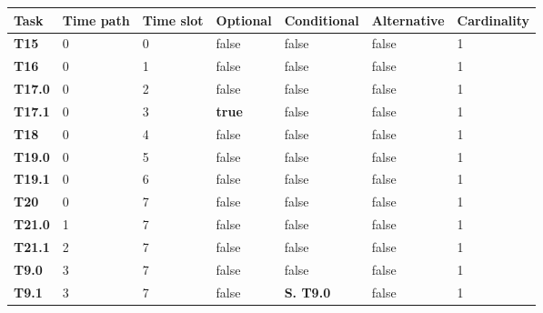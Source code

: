 \begin{table}[ht!]
{\renewcommand{\arraystretch}{1.5}
\begin{tabularx}{\textwidth}{@{}lllllll@{}}
\toprule
\textbf{Task}  & \textbf{Time path} & \textbf{Time slot} & \textbf{Optional} & \textbf{Conditional} & \textbf{Alternative} & \textbf{Cardinality} \\ \midrule
\textbf{T15}   & 0                  & 0                  & false             & false                & false                & 1           \\
\textbf{T16}   & 0                  & 1                  & false             & false                & false                & 1           \\
\textbf{T17.0} & 0                  & 2                  & false             & false                & false                & 1           \\
\textbf{T17.1} & 0                  & 3                  & \textbf{true}    & false                 & false                & 1           \\
\textbf{T18}   & 0                  & 4                  & false             & false                & false                & 1           \\
\textbf{T19.0} & 0                  & 5                  & false             & false                & false                & 1           \\
\textbf{T19.1} & 0                  & 6                  & false             & false                & false                & 1           \\
\textbf{T20}   & 0                  & 7                  & false             & false                & false                & 1           \\
\textbf{T21.0}   & 1                & 7                  & false             & false                & false                & 1           \\
\textbf{T21.1}   & 2                & 7                  & false             & false                & false                & 1           \\
\textbf{T9.0}  & 3                  & 7                  & false             & false	        		& false                 & 1           \\
\textbf{T9.1}  & 3                  & 7                  & false             & \textbf{S. T9.0}     & false                 & 1           \\

\end{tabularx}}
\end{table}
